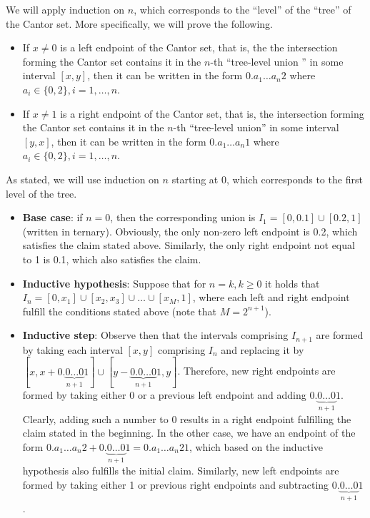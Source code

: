 \begin{solution}
    We will apply induction on $n$, which corresponds to the ``level'' of the ``tree'' of the Cantor set.
    More specifically, we will prove the following.
    \begin{itemize}
        \item If $x \neq 0$ is a left endpoint of the Cantor set, that is, the the intersection forming the Cantor set contains it in the $n$-th ``tree-level union '' in some interval $[x, y]$, then it can be written in the form $0.a_1 \ldots a_n 2$ where $a_i \in \{0, 2\}, i =1, \ldots, n$.
        \item If $x \neq 1$ is a right endpoint of the Cantor set, that is, the intersection forming the Cantor set contains it in the $n$-th ``tree-level union'' in some interval $[y, x]$, then it can be written in the form $0.a_1 \ldots a_n 1$ where $a_i \in \{0, 2\}, i =1, \ldots, n$.
    \end{itemize}
    As stated, we will use induction on $n$ starting at 0, which corresponds to the first level of the tree.
    \begin{itemize}
        \item \textbf{Base case}: if $n = 0$, then the corresponding union is $I_1 = [0, 0.1] \cup [0.2, 1]$ (written in ternary).
        Obviously, the only non-zero left endpoint is 0.2, which satisfies the claim stated above.
        Similarly, the only right endpoint not equal to 1 is 0.1, which also satisfies the claim.
        \item \textbf{Inductive hypothesis}: Suppose that for $n = k, k \geq 0$ it holds that $I_n = [0, x_1] \cup [x_2, x_3] \cup \ldots \cup [x_M, 1]$, where each left and right endpoint fulfill the conditions stated above (note that $M = 2^{n + 1}$).
        \item \textbf{Inductive step}: Observe then that the intervals comprising $I_{n+1}$ are formed by taking each interval $[x, y]$ comprising $I_n$ and replacing it by $[x, x + 0.\underbrace{0 \ldots 0}_{n + 1} 1] \cup [y - \underbrace{0.0\ldots 0}_{n + 1} 1, y]$.
        Therefore, new right endpoints are formed by taking either 0 or a previous left endpoint and adding $0.\underbrace{0 \ldots 0}_{n + 1} 1$.
        Clearly, adding such a number to 0 results in a right endpoint fulfilling the claim stated in the beginning.
        In the other case, we have an endpoint of the form $0.a_1 \ldots a_n 2 + 0.\underbrace{0 \ldots 0}_{n + 1} 1 = 0.a_1 \ldots a_n 2 1$, which based on the inductive hypothesis also fulfills the initial claim.
        Similarly, new left endpoints are formed by taking either 1 or previous right endpoints and subtracting $0.\underbrace{0 \ldots 0}_{n + 1} 1$.

\end{itemize}
\end{solution}
